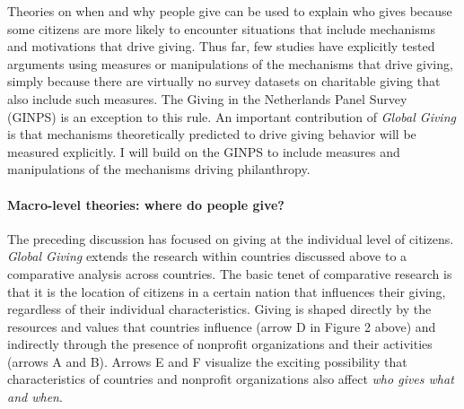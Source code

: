 \documentclass[twocolumn, serif, rga, numeric]{jote-article}
\begin{document}
Theories on when and why people give can be used to explain who gives because some citizens are more likely to encounter situations that include mechanisms and motivations that drive giving.\cite{Bekkers2011d, Wiepking2012} Thus far, few studies have explicitly tested arguments using measures or manipulations of the mechanisms that drive giving, simply because there are virtually no survey datasets on charitable giving that also include such measures.
The Giving in the Netherlands Panel Survey (GINPS) is an exception to this rule.\cite{Bekkers2013} An important contribution of \emph{Global Giving} is that mechanisms theoretically predicted to drive giving behavior will be measured explicitly. I will build on the GINPS to include measures and manipulations of the mechanisms driving philanthropy.

\paragraph{Macro-level theories: where do people give?}

The preceding discussion has focused on giving at the individual level of citizens. \emph{Global Giving} extends the research within countries discussed above to a comparative analysis across countries. The basic tenet of comparative research is that it is the location of citizens in a certain nation that influences their giving, regardless of their individual characteristics. Giving is shaped directly by the resources and values that countries influence (arrow D in Figure 2 above) and indirectly through the presence of nonprofit organizations and their activities (arrows A and B). Arrows E and F visualize the exciting possibility that characteristics of countries and nonprofit organizations also affect \emph{who gives what and when}.
\end{document}
